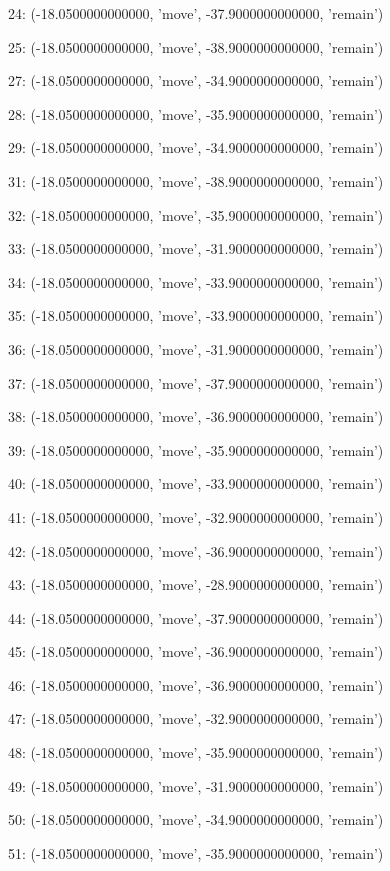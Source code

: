 24: (-18.0500000000000, 'move', -37.9000000000000, 'remain')


25: (-18.0500000000000, 'move', -38.9000000000000, 'remain')


27: (-18.0500000000000, 'move', -34.9000000000000, 'remain')


28: (-18.0500000000000, 'move', -35.9000000000000, 'remain')


29: (-18.0500000000000, 'move', -34.9000000000000, 'remain')


31: (-18.0500000000000, 'move', -38.9000000000000, 'remain')


32: (-18.0500000000000, 'move', -35.9000000000000, 'remain')


33: (-18.0500000000000, 'move', -31.9000000000000, 'remain')


34: (-18.0500000000000, 'move', -33.9000000000000, 'remain')


35: (-18.0500000000000, 'move', -33.9000000000000, 'remain')


36: (-18.0500000000000, 'move', -31.9000000000000, 'remain')


37: (-18.0500000000000, 'move', -37.9000000000000, 'remain')


38: (-18.0500000000000, 'move', -36.9000000000000, 'remain')


39: (-18.0500000000000, 'move', -35.9000000000000, 'remain')


40: (-18.0500000000000, 'move', -33.9000000000000, 'remain')


41: (-18.0500000000000, 'move', -32.9000000000000, 'remain')


42: (-18.0500000000000, 'move', -36.9000000000000, 'remain')


43: (-18.0500000000000, 'move', -28.9000000000000, 'remain')


44: (-18.0500000000000, 'move', -37.9000000000000, 'remain')


45: (-18.0500000000000, 'move', -36.9000000000000, 'remain')


46: (-18.0500000000000, 'move', -36.9000000000000, 'remain')


47: (-18.0500000000000, 'move', -32.9000000000000, 'remain')


48: (-18.0500000000000, 'move', -35.9000000000000, 'remain')


49: (-18.0500000000000, 'move', -31.9000000000000, 'remain')


50: (-18.0500000000000, 'move', -34.9000000000000, 'remain')


51: (-18.0500000000000, 'move', -35.9000000000000, 'remain')


